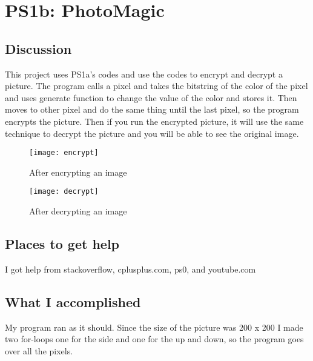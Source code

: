 \section{PS1b: PhotoMagic}\label{sec:ps1b}

\subsection{Discussion}\label{sec:ps1b:disc}

This project uses PS1a's codes and use the codes to encrypt and decrypt a picture. The program calls a pixel and takes the bitstring of the color of the pixel and uses generate function to change the value of the color and stores it. Then moves to other pixel and do the same thing until the last pixel, so the program encrypts the picture. Then if you run the encrypted picture, it will use the same technique to decrypt the picture and you will be able to see the original image.


\begin{figure}[tbh]
	\centering
	\texttt{[image: encrypt]}
	\caption{After encrypting an image}
	\label{fig:Encrypt}
\end{figure}

\begin{figure}[tbh]
	\centering
	\texttt{[image: decrypt]}
	\caption{After decrypting an image}
	\label{fig:Decrypt}
\end{figure}

\subsection{Places to get help}

I got help from stackoverflow, cplusplus.com, ps0, and youtube.com


\subsection{What I accomplished}\label{sec:ps1b:accomplish}

My program ran as it should. Since the size of the picture was 200 x 200 I made two for-loops one for the side and one for the up and down, so the program goes over all the pixels.




